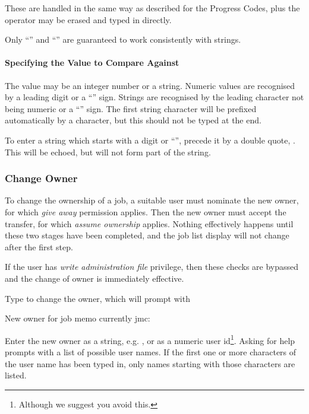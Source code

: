 These are handled in the same way as described for the Progress Codes,
plus the operator may be erased and typed in directly.

Only ``\exampletext{=}'' and ``\exampletext{!=}'' are guaranteed to work consistently with strings.

\paragraph{Specifying the Value to Compare Against}
The value may be an integer number or a string. Numeric values are recognised by a leading digit or a
``\exampletext{{}-}'' sign. Strings are recognised by the leading character not being numeric or a
``\exampletext{{}-}'' sign. The first string character will be prefixed automatically by a
\exampletext{{\textquotedbl}} character, but this should not be typed at the end.

To enter a string which starts with a digit or ``\exampletext{{}-}'', precede it by
a double quote, \exampletext{{\textquotedbl}}. This will be echoed, but will not form part of the string.

\subsubsection{Change Owner}
To change the ownership of a job, a suitable user must nominate the new
owner, for which \textit{give away} permission applies. Then the new
owner must accept the transfer, for which \textit{assume ownership}
applies. Nothing effectively happens until these two stages have been
completed, and the job list display will not change after the first
step.

If the user has \textit{write administration file} privilege, then these
checks are bypassed and the change of owner is immediately effective.

Type  to change the owner, which will prompt with

\begin{expara}

New owner for job {\textquotesingle}memo{\textquotesingle} currently jmc:

\end{expara}

Enter the new owner as a string, e.g. , or as a
numeric user id\footnote{Although we suggest you avoid this.}. Asking
for help prompts with a list of possible user names. If the first one
or more characters of the user name has been typed in, only names
starting with those characters are listed.

